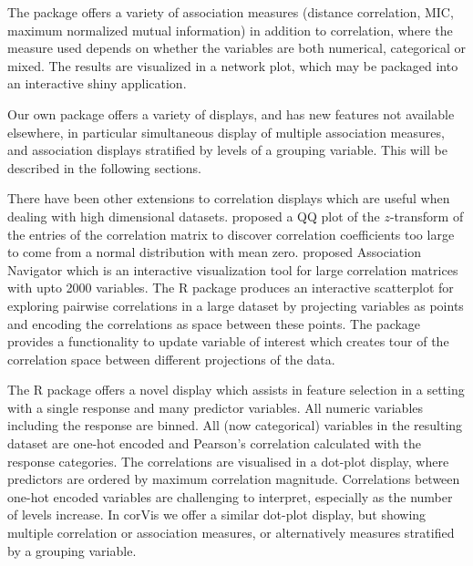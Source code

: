 The package  \citep{linkspotter} offers a variety
of association measures (distance correlation, MIC, maximum normalized
mutual information) in addition to correlation, where the measure used
depends on whether the variables are both numerical, categorical or
mixed. The results are visualized in a network plot, which may be
packaged into an interactive shiny application.

Our own package  offers a variety of displays, and has
new features not available elsewhere, in particular simultaneous display
of multiple association measures, and association displays stratified by
levels of a grouping variable. This will be described in the following
sections.

There have been other extensions to correlation displays which are
useful when dealing with high dimensional datasets.
\citet{hills1969looking} proposed a QQ plot of the \(z\)-transform of
the entries of the correlation matrix to discover correlation
coefficients too large to come from a normal distribution with mean
zero. \citet{buja2016visualization} proposed Association Navigator which
is an interactive visualization tool for large correlation matrices with
upto 2000 variables. The R package  \citep{scorr}
produces an interactive scatterplot for exploring pairwise correlations
in a large dataset by projecting variables as points and encoding the
correlations as space between these points. The package provides a
functionality to update variable of interest which creates tour of the
correlation space between different projections of the data.

The R package  offers a novel display which
assists in feature selection in a setting with a single response and
many predictor variables. All numeric variables including the response
are binned. All (now categorical) variables in the resulting dataset are
one-hot encoded and Pearson's correlation calculated with the response
categories. The correlations are visualised in a dot-plot display, where
predictors are ordered by maximum correlation magnitude. Correlations
between one-hot encoded variables are challenging to interpret,
especially as the number of levels increase. In corVis we offer a
similar dot-plot display, but showing multiple correlation or
association measures, or alternatively measures stratified by a grouping
variable.


